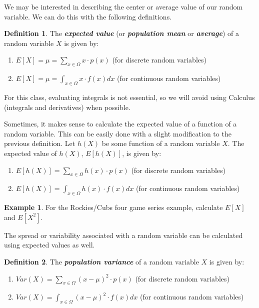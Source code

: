 \documentclass[
  11pt,
]{book}
\theoremstyle{definition}
\newtheorem{definition}{Definition}[chapter]
\theoremstyle{definition}
\newtheorem{example}{Example}[chapter]
\theoremstyle{definition}
\theoremstyle{definition}
\theoremstyle{remark}
\begin{document}
\vfill

We may be interested in describing the center or average value of our random variable. We can do this with the following definitions.

\begin{definition}

The \textbf{\emph{expected value}} (or \textbf{\emph{population mean}} or \textbf{\emph{average}}) of a random variable \(X\) is given by:

\begin{enumerate}
\def\labelenumi{(\roman{enumi})}
\item
  \(E[X] = \mu = \sum_{x \in \Omega} x \cdot p(x)\) (for discrete random variables)
\item
  \(E[X] = \mu = \int_{x \in \Omega} x \cdot f(x) dx\) (for continuous random variables)
\end{enumerate}

\end{definition}

For this class, evaluating integrals is not essential, so we will avoid using Calculus (integrals and derivatives) when possible.

Sometimes, it makes sense to calculate the expected value of a function of a random variable. This can be easily done with a slight modification to the previous definition. Let \(h(X)\) be some function of a random variable \(X\). The expected value of \(h(X)\), \(E[h(X)]\), is given by:

\begin{enumerate}
\def\labelenumi{(\roman{enumi})}
\item
  \(E[h(X)] = \sum_{x \in \Omega} h(x) \cdot p(x)\) (for discrete random variables)
\item
  \(E[h(X)] = \int_{x \in \Omega} h(x) \cdot f(x) dx\) (for continuous random variables)
\end{enumerate}

\begin{example}
For the Rockies/Cubs four game series example, calculate \(E[X]\) and \(E[X^2]\).
\end{example}

\vfill

\newpage

The spread or variability associated with a random variable can be calculated using expected values as well.

\begin{definition}

The \textbf{\emph{population variance}} of a random variable \(X\) is given by:\\

\begin{enumerate}
\def\labelenumi{(\roman{enumi})}
\item
  \(Var(X) = \sum_{x \in \Omega} (x-\mu)^2 \cdot p(x)\) (for discrete random variables)
\item
  \(Var(X) = \int_{x \in \Omega} (x-\mu)^2 \cdot f(x) dx\) (for continuous random variables)
\end{enumerate}

\end{definition}
\end{document}
